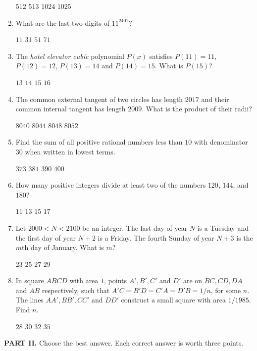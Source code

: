 \documentclass[11pt,paper=letter]{scrartcl}
\begin{document}
\begin{enumerate}
  \fourch
  {$512$}
  {$513$}
  {$1024$}
  {$1025$}

  \item What are the last two digits of $11^{2401}$?

  \fourch
  {$11$}
  {$31$}
  {$51$}
  {$71$}

  \item The \emph{hotel elevator cubic} polynomial $P(x)$ satisfies $P(11) = 11$, $P(12) = 12$, $P(13) = 14$ and $P(14) = 15$. What is $P(15)$?

  \fourch
  {$13$}
  {$14$}
  {$15$}
  {$16$}

  \item The common external tangent of two circles has length $2017$ and their common internal tangent has length $2009$. What is the product of their radii?

  \fourch
  {$8040$}
  {$8044$}
  {$8048$}
  {$8052$}

  \item Find the sum of all positive rational numbers less than $10$ with denominator $30$ when written in lowest terms.

  \fourch
  {$373$}
  {$381$}
  {$390$}
  {$400$}

  \item How many positive integers divide at least two of the numbers $120$, $144$, and $180$?

  \fourch
  {$11$}
  {$13$}
  {$15$}
  {$17$}

  \item Let $2000 < N < 2100$ be an integer. The last day of year $N$ is a Tuesday and the first day of year $N+2$ is a Friday. The fourth Sunday of year $N+3$ is the $m$th day of January. What is $m$?

  \fourch
  {$23$}
  {$25$}
  {$27$}
  {$29$}

  \item In square $ABCD$ with area $1$, points $A', B', C'$ and $D'$ are on $BC, CD, DA$ and $AB$ respectively, such that $A'C = B'D = C'A = D'B = 1/n$, for some $n$. The lines $AA', BB', CC'$ and $DD'$ construct a small square with area $1/1985$. Find $n$.

  \fourch
  {$28$}
  {$30$}
  {$32$}
  {$35$}
\end{enumerate}

\vspace{1em}
\noindent\textbf{PART II.} Choose the best answer. Each correct answer is worth three points.
\end{document}
